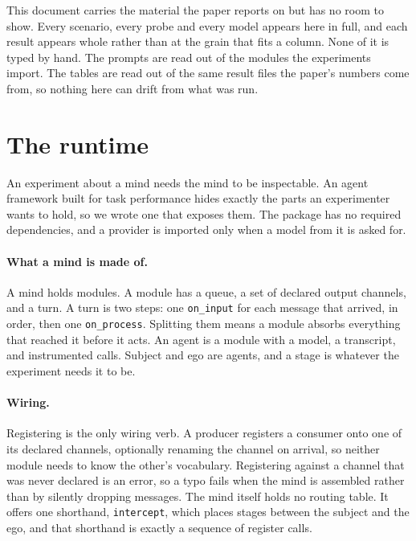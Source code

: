 \documentclass[11pt,letterpaper]{article}
\begin{document}

\noindent
This document carries the material the paper reports on but has no room to
show. Every scenario, every probe and every model appears here in full, and
each result appears whole rather than at the grain that fits a column. None of
it is typed by hand. The prompts are read out of the modules the experiments
import. The tables are read out of the same result files the paper's numbers
come from, so nothing here can drift from what was run.

\appendix

\section{The runtime}
\label{app:framework}

An experiment about a mind needs the mind to be inspectable. An agent framework
built for task performance hides exactly the parts an experimenter wants to
hold, so we wrote one that exposes them. The package has no required
dependencies, and a provider is imported only when a model from it is asked
for.

\paragraph{What a mind is made of.} A mind holds modules. A module has a queue,
a set of declared output channels, and a turn. A turn is two steps: one
\texttt{on\_input} for each message that arrived, in order, then one
\texttt{on\_process}. Splitting them means a module absorbs everything that
reached it before it acts. An agent is a module with a model, a transcript, and
instrumented calls. Subject and ego are agents, and a stage is whatever the
experiment needs it to be.

\paragraph{Wiring.} Registering is the only wiring verb. A producer registers a
consumer onto one of its declared channels, optionally renaming the channel on
arrival, so neither module needs to know the other's vocabulary. Registering
against a channel that was never declared is an error, so a typo fails when the
mind is assembled rather than by silently dropping messages. The mind itself
holds no routing table. It offers one shorthand, \texttt{intercept}, which
places stages between the subject and the ego, and that shorthand is exactly a
sequence of register calls.
\end{document}
